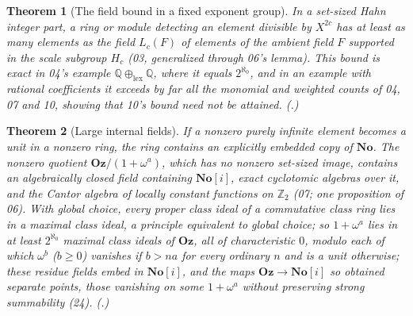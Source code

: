 \documentclass[11pt,letterpaper]{article}
\numberwithin{equation}{section}
\theoremstyle{definition}
\theoremstyle{remark}
\theoremstyle{plain}
\newtheorem{maintheorem}{Theorem}
\newcommand{\No}{\mathbf{No}}
\newcommand{\Oz}{\mathbf{Oz}}
\newcommand{\SC}{\No[i]}
\newcommand{\Z}{\mathbb Z}
\newcommand{\Q}{\mathbb Q}
\begin{document}
\begin{maintheorem}[The field bound in a fixed exponent group]\label{osq:main:fieldbound}
In a set-sized Hahn integer part, a ring or module detecting an element divisible by $X^{2c}$
has at least as many elements as the field $L_c(F)$ of elements of the ambient field $F$
supported in the scale subgroup $H_c$ (03, generalized through 06's lemma). This bound is exact in 04's example $\Q\oplus_{\mathrm{lex}}\Q$, where it
equals $2^{\aleph_0}$, and in an example with rational coefficients it exceeds by far all the
monomial and weighted counts of 04, 07 and 10, showing that 10's bound need not be attained.
(.)
\end{maintheorem}

\begin{maintheorem}[Large internal fields]\label{osq:main:internal}
If a nonzero purely infinite element becomes a unit in a nonzero ring, the ring contains an
explicitly embedded copy of $\No$. The nonzero quotient $\Oz/(1+\omega^a)$, which has no
nonzero set-sized image, contains an algebraically closed field containing $\SC$, exact
cyclotomic algebras over it, and the Cantor algebra of locally constant functions on $\Z_2$
(07; one proposition of 06). With global choice, every proper class ideal of a commutative class ring lies in a maximal class
ideal, a principle equivalent to global choice; so $1+\omega^a$ lies in at least $2^{\aleph_0}$ maximal class ideals of $\Oz$, all of
characteristic $0$, modulo each of which $\omega^b$ ($b\ge0$) vanishes if $b>na$ for every ordinary $n$ and is a unit otherwise; these
residue fields embed in $\SC$, and the maps $\Oz\to\SC$ so obtained separate points, those vanishing on some $1+\omega^a$ without preserving
strong summability (24).
(.)
\end{maintheorem}
\end{document}
